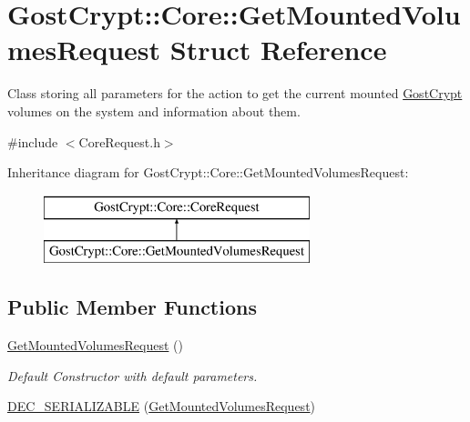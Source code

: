 \hypertarget{struct_gost_crypt_1_1_core_1_1_get_mounted_volumes_request}{}\section{Gost\+Crypt\+:\+:Core\+:\+:Get\+Mounted\+Volumes\+Request Struct Reference}
\label{struct_gost_crypt_1_1_core_1_1_get_mounted_volumes_request}


Class storing all parameters for the action to get the current mounted \hyperlink{namespace_gost_crypt}{Gost\+Crypt} volumes on the system and information about them.  




{\ttfamily \#include $<$Core\+Request.\+h$>$}

Inheritance diagram for Gost\+Crypt\+:\+:Core\+:\+:Get\+Mounted\+Volumes\+Request\+:\begin{figure}[H]
\begin{center}
\leavevmode
\includegraphics[height=2.000000cm]{struct_gost_crypt_1_1_core_1_1_get_mounted_volumes_request}
\end{center}
\end{figure}
\subsection*{Public Member Functions}
\begin{DoxyCompactItemize}
\item 
\hyperlink{struct_gost_crypt_1_1_core_1_1_get_mounted_volumes_request_a9eb7c5f0db25b5b4800d4613456b9fe1}{Get\+Mounted\+Volumes\+Request} ()
\begin{DoxyCompactList}\small\item\em Default Constructor with default parameters. \end{DoxyCompactList}\item 
\hyperlink{struct_gost_crypt_1_1_core_1_1_get_mounted_volumes_request_a80ad0b77911663230328d4a4b8111e61}{D\+E\+C\+\_\+\+S\+E\+R\+I\+A\+L\+I\+Z\+A\+B\+LE} (\hyperlink{struct_gost_crypt_1_1_core_1_1_get_mounted_volumes_request}{Get\+Mounted\+Volumes\+Request})
\end{DoxyCompactItemize}
